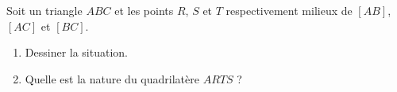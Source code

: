 
\begin{exercice}\label{exosmath-0999}

    Soit un triangle \( ABC\) et les points \( R\), \( S\) et \( T\) respectivement milieux de \( [AB]\), \( [AC]\) et \( [BC]\).
    \begin{enumerate}
        \item
            Dessiner la situation.
        \item
            Quelle est la nature du quadrilatère \( ARTS\) ?
    \end{enumerate}

\end{exercice}
